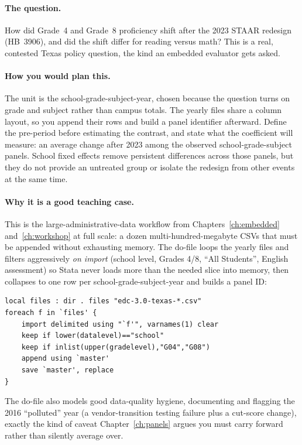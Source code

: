 \paragraph{The question.} How did Grade~4 and Grade~8 proficiency shift after the 2023 STAAR redesign (HB~3906), and did the shift differ for reading versus math? This is a real, contested Texas policy question, the kind an embedded evaluator gets asked.

\paragraph{How you would plan this.} The unit is the school-grade-subject-year, chosen because the question turns on grade and subject rather than campus totals. The yearly files share a column layout, so you append their rows and build a panel identifier afterward. Define the pre-period before estimating the contrast, and state what the coefficient will measure: an average change after 2023 among the observed school-grade-subject panels. School fixed effects remove persistent differences across those panels, but they do not provide an untreated group or isolate the redesign from other events at the same time.

\paragraph{Why it is a good teaching case.} This is the large-administrative-data workflow from Chapters~\ref{ch:embedded} and~\ref{ch:workshop} at full scale: a dozen multi-hundred-megabyte CSVs that must be appended without exhausting memory. The do-file loops the yearly files and filters aggressively \emph{on import} (school level, Grades 4/8, \enquote{All Students}, English assessment) so Stata never loads more than the needed slice into memory, then collapses to one row per school-grade-subject-year and builds a panel ID:
\par
{\footnotesize
\begin{verbatim}
local files : dir . files "edc-3.0-texas-*.csv"
foreach f in `files' {
    import delimited using "`f'", varnames(1) clear
    keep if lower(datalevel)=="school"
    keep if inlist(upper(gradelevel),"G04","G08")
    append using `master'
    save `master', replace
}
\end{verbatim}
}
The do-file also models good data-quality hygiene, documenting and flagging the 2016 \enquote{polluted} year (a vendor-transition testing failure plus a cut-score change), exactly the kind of caveat Chapter~\ref{ch:panels} argues you must carry forward rather than silently average over.

